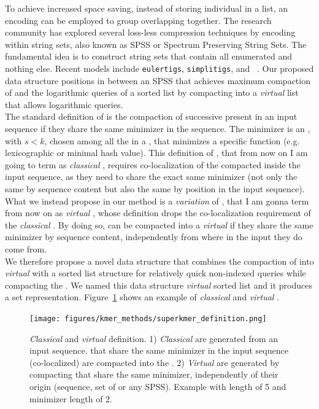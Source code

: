 To achieve increased space saving, instead of storing individual \kmers in a list, an encoding can be employed to group overlapping \kmer together. The \kmer research community has explored several loss-less compression techniques by encoding \kmers within string sets, also known as \gls{SPSS} or Spectrum Preserving String Sets. The fundamental idea is to construct string sets that contain all enumerated \kmers and nothing else. Recent models include \texttt{eulertigs}, \texttt{simplitigs}, and \texttt{\skmers} ~\cite{marchet2024kmersets}. Our proposed data structure positions in between an SPSS that achieves maximum compaction of \kmers and the logarithmic queries of a sorted \kmer list by compacting \kmers into a \emph{virtual} \skmer list that allows logarithmic queries. \\
The standard definition of \skmer is the compaction of successive \kmers present in an input sequence if they share the same minimizer in the sequence. The minimizer is an \smer, with $ s < k$, chosen among all the \smers in a \kmer, that minimizes a specific function (e.g. lexicographic or minimal hash value). This definition of \skmer, that from now on I am going to term as \emph{classical} \skmer, requires co-localization of the compacted \kmers inside the input sequence, as they need to share the exact same minimizer (not only the same by sequence content but also the same by position in the input sequence). \\
What we instead propose in our method is a \emph{variation} of \skmer, that I am gonna term from now on as \emph{virtual} \skmer, whose definition drops the co-localization requirement of the \emph{classical} \skmer. By doing so, \kmers can be compacted into a \emph{virtual} \skmer if they share the same minimizer by sequence content, independently from where in the input they do come from.\\
We therefore propose a novel data structure that combines the compaction of \kmers into \emph{virtual} \skmers with a sorted list structure for relatively quick non-indexed \kmer queries while compacting the \kmers. We named this data structure \emph{virtual} \skmers sorted list and it produces a \kmer set representation. Figure~\ref{fig:skmer_definition} shows an example of \emph{classical} and \emph{virtual} \skmers.

\begin{figure}[H]
	\centering
	\texttt{[image: figures/kmer\_methods/superkmer\_definition.png]}
	\caption[\emph{Classical} \skmer and \emph{virtual} \skmer definition.]{\emph{Classical} \skmer and \emph{virtual} \skmer definition. 1) \emph{Classical} \skmers are generated from an input sequence. \kmers that share the same minimizer in the input sequence (co-localized) are compacted into the \skmer. 2) \emph{Virtual} \skmers are generated by compacting \kmers that share the same minimizer, independently of their origin (sequence, set of \kmers or any \gls{SPSS}). Example with \kmer length of 5 and minimizer length of 2.}
	\label{fig:skmer_definition}
\end{figure}

